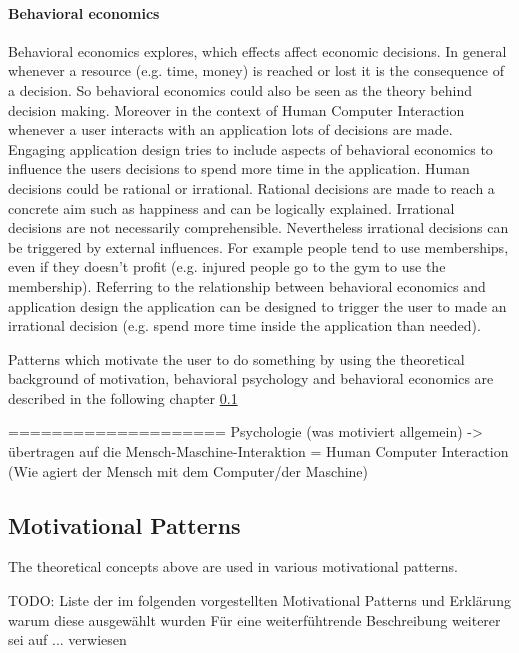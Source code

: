 \paragraph*{Behavioral economics}

Behavioral economics explores, which effects affect economic decisions. In general whenever a resource (e.g. time, money) is reached or lost it is the consequence of a decision. So behavioral economics could also be seen as the theory behind decision making. Moreover in the context of Human Computer Interaction whenever a user interacts with an application 
lots of decisions are made. Engaging application design tries to include aspects of behavioral economics to influence the users decisions to spend more time in the application. 
Human decisions could be rational or irrational. Rational decisions are made to reach a concrete aim such as happiness and can be logically explained. Irrational decisions are not necessarily comprehensible.  Nevertheless irrational decisions can be triggered by external influences. For example people tend to use memberships, even if they doesn't profit (e.g. injured people go to the gym to use the membership).
Referring to the relationship between behavioral economics and application design the application can be designed to trigger the user to made an irrational decision (e.g. spend more time inside the application than needed). \cite[p. 19]{lewisIrresistibleAppsMotivational2014}


Patterns which motivate the user to do something by using the theoretical background of motivation, behavioral psychology and behavioral economics are described in the following chapter \ref{sec:theoryBc}

====================\newline
Psychologie (was motiviert allgemein) -> übertragen auf die Mensch-Maschine-Interaktion = Human Computer Interaction (Wie agiert der Mensch mit dem Computer/der Maschine)

\subsection{Motivational Patterns}
\label{sec:theoryBc}

The theoretical concepts above are used in various motivational patterns.

TODO: Liste der im folgenden vorgestellten Motivational Patterns und Erklärung warum diese ausgewählt wurden
Für eine weiterfühtrende Beschreibung weiterer sei auf ... verwiesen

